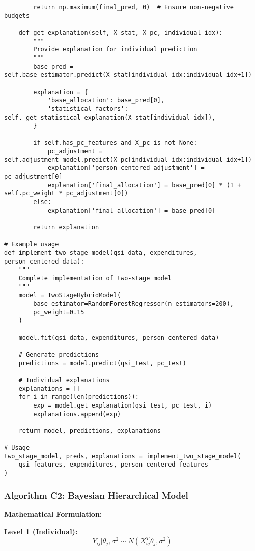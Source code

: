 \begin{lstlisting}
        return np.maximum(final_pred, 0)  # Ensure non-negative budgets
    
    def get_explanation(self, X_stat, X_pc, individual_idx):
        """
        Provide explanation for individual prediction
        """
        base_pred = self.base_estimator.predict(X_stat[individual_idx:individual_idx+1])
        
        explanation = {
            'base_allocation': base_pred[0],
            'statistical_factors': self._get_statistical_explanation(X_stat[individual_idx]),
        }
        
        if self.has_pc_features and X_pc is not None:
            pc_adjustment = self.adjustment_model.predict(X_pc[individual_idx:individual_idx+1])
            explanation['person_centered_adjustment'] = pc_adjustment[0]
            explanation['final_allocation'] = base_pred[0] * (1 + self.pc_weight * pc_adjustment[0])
        else:
            explanation['final_allocation'] = base_pred[0]
            
        return explanation

# Example usage
def implement_two_stage_model(qsi_data, expenditures, person_centered_data):
    """
    Complete implementation of two-stage model
    """
    model = TwoStageHybridModel(
        base_estimator=RandomForestRegressor(n_estimators=200),
        pc_weight=0.15
    )
    
    model.fit(qsi_data, expenditures, person_centered_data)
    
    # Generate predictions
    predictions = model.predict(qsi_test, pc_test)
    
    # Individual explanations
    explanations = []
    for i in range(len(predictions)):
        exp = model.get_explanation(qsi_test, pc_test, i)
        explanations.append(exp)
    
    return model, predictions, explanations

# Usage
two_stage_model, preds, explanations = implement_two_stage_model(
    qsi_features, expenditures, person_centered_features
)
\end{lstlisting}

\subsubsection{Algorithm C2: Bayesian Hierarchical Model}

\textbf{Mathematical Formulation:}

\textbf{Level 1 (Individual):}
\begin{equation}
Y_{ij} | \theta_j, \sigma^2 \sim N(X_{ij}^T\theta_j, \sigma^2)
\end{equation}

